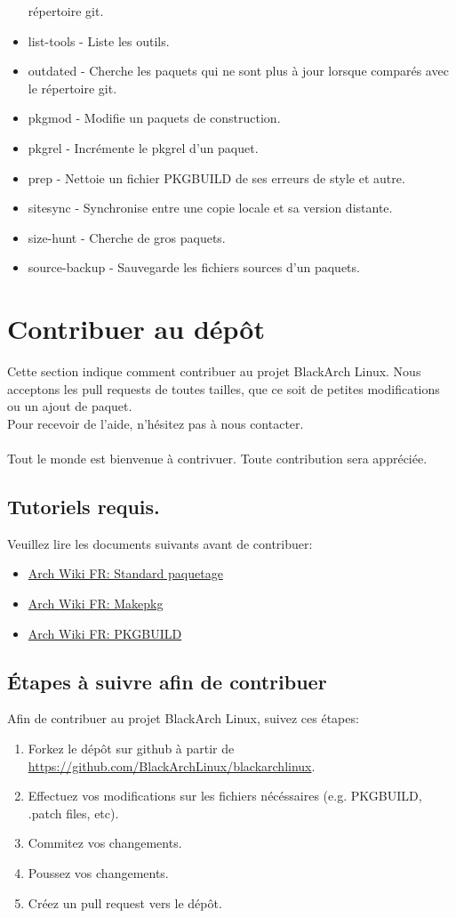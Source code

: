 \documentclass[a4paper, oneside, 11pt]{book}
\begin{document}
\begin{itemize}
répertoire git.
\item list-tools - Liste les outils.
\item outdated - Cherche les paquets qui ne sont plus à jour lorsque comparés 
avec le répertoire git.
\item pkgmod - Modifie un paquets de construction.
\item pkgrel - Incrémente le pkgrel d'un paquet.
\item prep - Nettoie un fichier PKGBUILD de ses erreurs de style et autre.
\item sitesync - Synchronise entre une copie locale et sa version distante.
\item size-hunt - Cherche de gros paquets.
\item source-backup - Sauvegarde les fichiers sources d'un paquets.
\end{itemize}

\section{Contribuer au dépôt}
Cette section indique comment contribuer au projet BlackArch Linux. Nous
acceptons les pull requests de toutes tailles, que ce soit de petites
modifications ou un ajout de paquet.\\Pour recevoir de l'aide, n'hésitez pas à
nous contacter.
\\\\
Tout le monde est bienvenue à contrivuer. Toute contribution sera appréciée.

\subsection{Tutoriels requis.}
Veuillez lire les documents suivants avant de contribuer:
\begin{itemize}
\item \href{http://wiki.archlinux.fr/Standard_paquetage}{Arch Wiki FR:
Standard paquetage}
\item \href{http://wiki.archlinux.fr/Makepkg}{Arch Wiki FR: Makepkg}
\item \href{http://wiki.archlinux.fr/PKGBUILD}{Arch Wiki FR: PKGBUILD}
\end{itemize}

\subsection{Étapes à suivre afin de contribuer}
Afin de contribuer au projet BlackArch Linux, suivez ces étapes:
\begin{enumerate}
\item Forkez le dépôt sur github à partir de
\url{https://github.com/BlackArchLinux/blackarchlinux}.
\item Effectuez vos modifications sur les fichiers nécéssaires (e.g. PKGBUILD,
.patch files, etc).
\item Commitez vos changements.
\item Poussez vos changements.
\item Créez un pull request vers le dépôt.
\end{enumerate}
\end{document}
